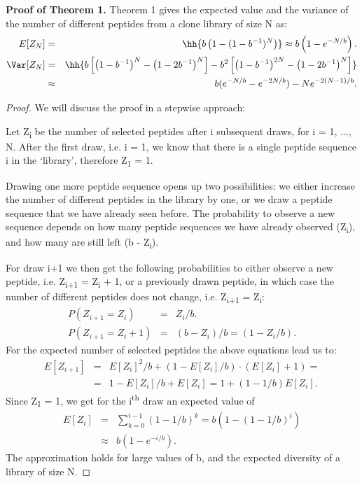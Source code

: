 {\bf Proof of Theorem 1.} Theorem 1 gives the expected value and the variance of the number of different peptides from a clone library of size N as:
\begin{eqnarray*}
E[Z_{N}] &=& \hh{b\left(1 - (1-b^{-1})^N\right)} \approx b \left(1 - e^{-N/b}\right). \\
\Var[Z_{N}] &=& \hh{b \left[ \left(1-b^{-1}\right)^{N} -  \left(1-2b^{-1}\right)^{N}\right]  - b^2 \left[ \left(1-b^{-1} \right)^{2N} -  \left(1-2b^{-1}\right)^{N}\right]}\\
&\approx& b (e^{-N/b} - e^{-2N/b}) - N e^{-2(N-1)/b}.
\end{eqnarray*}

\begin{proof}
We will discuss the proof in a stepwise approach:

Let Z\textsubscript{i} be the number of selected peptides after i subsequent draws, for i = 1, ..., N. After the first draw, i.e.  i = 1, we know that there is a single peptide sequence i in the `library', therefore Z\textsubscript{1} = 1. 

Drawing one more peptide sequence opens up two possibilities: we either increase the number of different peptides in the library by one, or we draw a peptide sequence that we have already seen before. The probability to observe a new sequence depends on how many peptide sequences we have already observed (Z\textsubscript{i}), and how many are still left (b - Z\textsubscript{i}). 

For draw i+1 we then get the following probabilities to either observe a new peptide, i.e. Z\textsubscript{i+1} = Z\textsubscript{i} + 1, or a previously drawn peptide, in which case the number of different peptides does not change, i.e. Z\textsubscript{i+1} = Z\textsubscript{i}:
\begin{eqnarray*}
P(Z_{i+1} = Z_i) &=& Z_i/b.\\
P(Z_{i+1} = Z_i+1) &=& (b-Z_i)/b = (1 - Z_i/b) .
\end{eqnarray*}
For the expected number of selected peptides the above equations lead us to:
\begin{eqnarray*}
E[Z_{i+1}] &=& E[Z_i]^2/b  + (1-E[Z_i]/b) \cdot (E[Z_i] + 1)  = \\
&=& 1-E[Z_i]/b + E[Z_i] = 1 + (1-1/b)E[Z_i].
\end{eqnarray*}
Since Z\textsubscript{1} = 1, we get 
for the i\textsuperscript{th} draw an expected value of 
\begin{eqnarray}
E[Z_i] &=& \sum_{k=0}^{i-1} (1 - 1/b)^k = b \left(1 - (1-1/b)^i\right) \label{eq:exp}\\
&\approx& b \left(1 - e^{-i/b}\right).\label{eq:approx}
\end{eqnarray}
The approximation holds for large values of b, and the expected diversity of a library of size N.


\end{proof}
